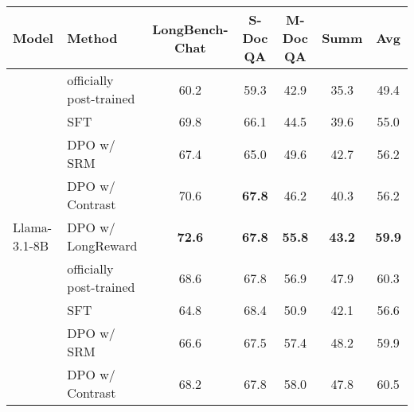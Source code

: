\begin{table*}[t]
{\begin{tabular}{llccccc}
\multirow{-2}{*}{Model}        & \multirow{-2}{*}{Method}                       & \multirow{-2}{*}{LongBench-Chat} & S-Doc QA                    & M-Doc QA                    & Summ                        & \multirow{-2}{*}{Avg}       \\ \midrule
                               & {\color[HTML]{8F959E} officially post-trained} & {\color[HTML]{8F959E} 60.2}      & {\color[HTML]{8F959E} 59.3} & {\color[HTML]{8F959E} 42.9} & {\color[HTML]{8F959E} 35.3} & {\color[HTML]{8F959E} 49.4} \\
                               & SFT                                            & 69.8                             & 66.1                        & 44.5                        & 39.6                        & 55.0                        \\
                               & DPO w/ SRM                                     & 67.4                             & 65.0                        & 49.6                        & 42.7                        & 56.2                        \\
                               & DPO w/ Contrast                                  & 70.6                             & \textbf{67.8}               & 46.2                        & 40.3                        & 56.2                        \\ 
\multirow{-5}{*}{Llama-3.1-8B} & DPO w/ LongReward                              & \textbf{72.6}                    & \textbf{67.8}               & \textbf{55.8}               & \textbf{43.2}               & \textbf{59.9}               \\ \midrule
                               & {\color[HTML]{8F959E} officially post-trained} & {\color[HTML]{8F959E} 68.6}      & {\color[HTML]{8F959E} 67.8} & {\color[HTML]{8F959E} 56.9} & {\color[HTML]{8F959E} 47.9} & {\color[HTML]{8F959E} 60.3} \\
                               & SFT                                            & 64.8                             & 68.4                        & 50.9                        & 42.1                        & 56.6                        \\
                               & DPO w/ SRM                                     & 66.6                             & 67.5                        & 57.4                        & 48.2                        & 59.9                        \\
                               & DPO w/ Contrast                                  & 68.2                             & 67.8                        & 58.0                        & 47.8                        & 60.5                        \\

\end{tabular}}
\end{table*}
